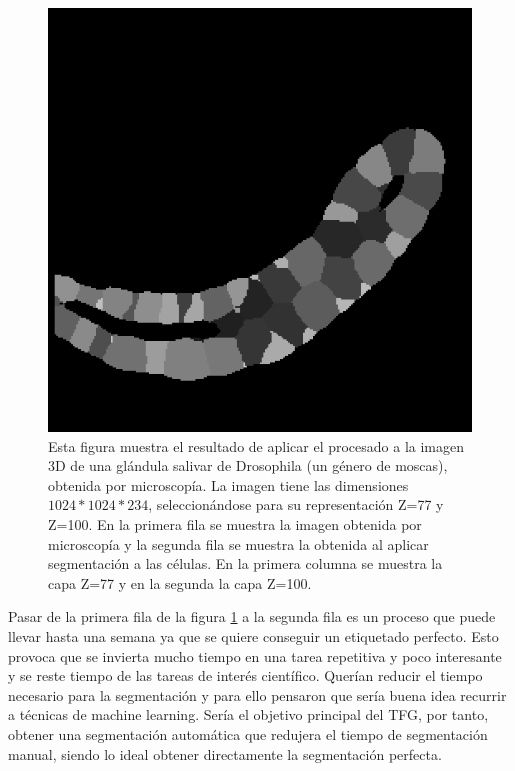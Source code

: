 \begin{figure}[ht]
\includegraphics[scale=0.2]{img/target 04_1a Z=100.png}
\caption{Esta figura muestra el resultado de aplicar el procesado a la imagen 3D de una glándula salivar de Drosophila (un género de moscas), obtenida por microscopía. La imagen tiene las dimensiones $1024*1024*234$, seleccionándose para su representación Z=77 y Z=100. En la primera fila se muestra la imagen obtenida por microscopía y la segunda fila se muestra la obtenida al aplicar segmentación a las células. En la primera columna se muestra la capa Z=77 y en la segunda la capa Z=100.}\bigskip
\label{fig:ejemplo1_segmentacion}
\end{figure}

Pasar de la primera fila de la figura \ref{fig:ejemplo1_segmentacion} a la segunda fila es un proceso que puede llevar hasta una semana ya que se quiere conseguir un etiquetado perfecto. Esto provoca que se invierta mucho tiempo en una tarea repetitiva y poco interesante y se reste tiempo de las tareas de interés científico. Querían reducir el tiempo necesario para la segmentación y para ello pensaron que sería buena idea recurrir a técnicas de machine learning. Sería el objetivo principal del TFG, por tanto, obtener una segmentación automática que redujera el tiempo de segmentación manual, siendo lo ideal obtener directamente la segmentación perfecta.